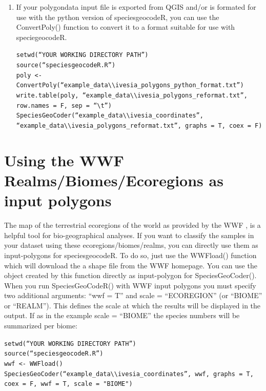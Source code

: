 \documentclass[a4paper,titlepage,11pt]{scrreprt}
\begin{document}
\begin{enumerate}
\item{If your polygondata input file is exported from QGIS and/or is formated for use with the python version of speciesgeocodeR, you can use the ConvertPoly() function to convert it to a format suitable for use with speciegeocodeR.}

\texttt{setwd(``YOUR WORKING DIRECTORY PATH'')}\\
\texttt{source(``speciesgeocodeR.R'')}\\
\texttt{poly \textless- ConvertPoly(``example\_data\textbackslash \textbackslash ivesia\_polygons\_python\_format.txt'')}\\
\texttt{write.table(poly, ``example\_data\textbackslash \textbackslash ivesia\_polygons\_reformat.txt'', row.names = F,  sep = ``\textbackslash t'')}\\
\texttt{SpeciesGeoCoder(``example\_data\textbackslash \textbackslash  ivesia\_coordinates'', }\\
\texttt{``example\_data\textbackslash \textbackslash ivesia\_polygons\_reformat.txt'',  graphs = T, coex = F)}
\end{enumerate}

\chapter{Using the WWF Realms/Biomes/Ecoregions as input polygons} \label{wwf}

The map of the terrestrial ecoregions of the world as provided by the WWF \citep{olson2001}, is a helpful tool for bio-geographical analyses. If you want to classify the samples in your dataset using these ecoregions/biomes/realms, you can directly use them as input-polygons for speciesgeocodeR. To do so, just use the WWFload() function which will download the a shape file from the WWF homepage.  You can use the object created by this function directly as input-polygon for SpeciesGeoCoder(). When you run SpeciesGeoCodeR() with WWF input polygons you must specify two additional arguments: ``wwf = T'' and scale = ``ECOREGION'' (or ``BIOME'' or ``REALM''). This defines the scale at which the results will be displayed in the output. If as in the example scale = ``BIOME'' the species numbers will be summarized per biome: 

\texttt{setwd(``YOUR WORKING DIRECTORY PATH'')}\\
\texttt{source(``speciesgeocodeR.R'')}\\
\texttt{wwf \textless- WWFload()}\\
\texttt{SpeciesGeoCoder(``example\_data\textbackslash \textbackslash  ivesia\_coordinates'', wwf,  graphs = T, coex = F, wwf = T, scale = "BIOME")}
\end{document}
